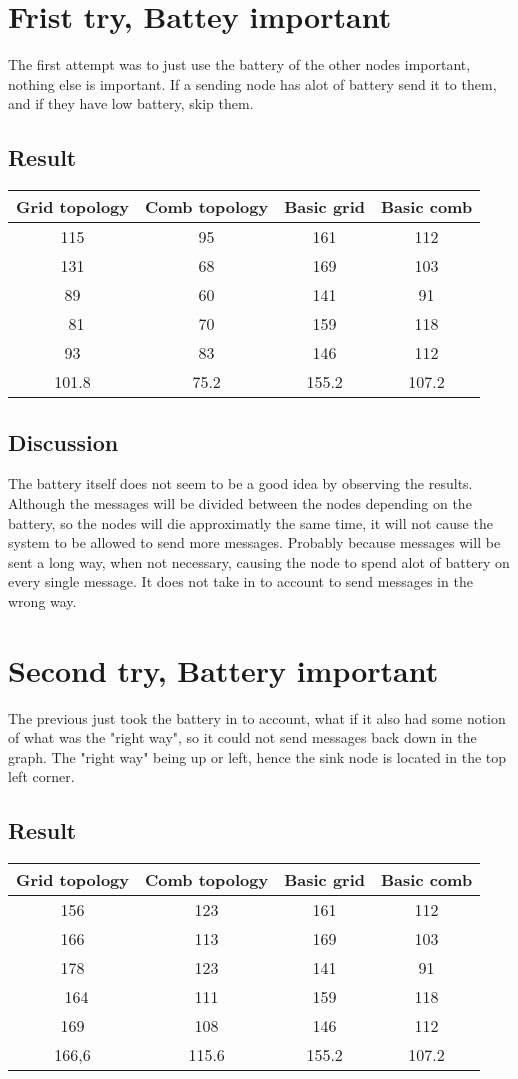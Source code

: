\documentclass{article}
\begin{document}
\section{Frist try, Battey important}
  The first attempt was to just use the battery of the other nodes
  important, nothing else is important. If a sending node has alot of battery
  send it to them, and if they have low battery, skip them.
  \subsection{Result}
    \begin{tabular}{c|c||c|c}
      Grid topology & Comb topology & Basic grid & Basic comb\\
      \hline
      \hline
      115 & 95 & 161 & 112\\
      131 & 68 & 169 & 103\\
      89  & 60 & 141 & 91\\\
      81  & 70 & 159 & 118\\
      93  & 83 & 146 & 112\\
      \hline
      101.8&75.2&155.2&107.2\\

      
    \end{tabular}
  \subsection{Discussion}
    The battery itself does not seem to be a good idea by observing the results. 
    Although the messages will be divided between the nodes depending on the battery,
    so the nodes will die approximatly the same time, it will not cause the 
    system to be allowed to send more messages. Probably because messages will be sent 
    a long way, when not necessary, causing the node to spend alot of battery on 
    every single message.
    It does not take in to account to send messages in the wrong way.
  \section{Second try, Battery important}
    The previous just took the battery in to account, what if it also had
    some notion of what was the "right way", so it could not send messages
    back down in the graph. The "right way" being up or left, hence the sink
    node is located in the top left corner.
  \subsection{Result}
    \begin{tabular}{c|c||c|c}
      Grid topology & Comb topology & Basic grid & Basic comb\\
      \hline
      \hline
      156 & 123 & 161 & 112\\
      166 & 113 & 169 & 103\\
      178 & 123 & 141 & 91\\\
      164 & 111 & 159 & 118\\
      169 & 108 & 146 & 112\\
      \hline
      166,6&115.6&155.2&107.2\\
    \end{tabular}
\end{document}

